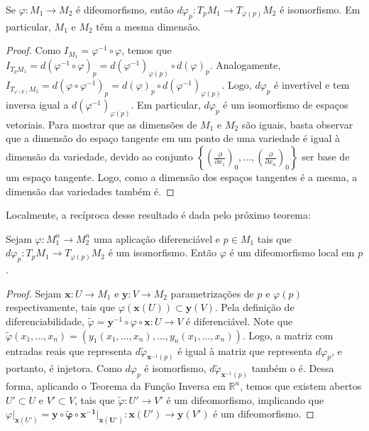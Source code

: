	\begin{proposition}
		\label{prop:difeomorfismo-dimensao}
		Se $\varphi:M_{1}\to M_{2}$ é difeomorfismo, então $d\varphi_{p}:T_{p}M_{1}\to T_{\varphi(p)}M_{2}$ é isomorfismo. Em particular, $M_{1}$ e $M_{2}$ têm a mesma dimensão.
		\begin{proof}

			Como $I_{M_{1}} =\varphi ^{-1} \circ \varphi$, temos que $I_{T_{p}M_{1}}=d(\varphi ^{-1} \circ \varphi)_{p}= d(\varphi ^{-1})_{\varphi(p)} \circ d(\varphi)_{p}$.
			Analogamente, $I_{T_{\varphi(p)}M_{2}}=d(\varphi \circ \varphi ^{-1})_{p}= d(\varphi)_{p} \circ d(\varphi ^{-1})_{\varphi(p)}$.
			Logo, $d\varphi_{p}$ é invertível e tem inversa igual a $d(\varphi ^{-1})_{\varphi(p)}$. Em particular, $d\varphi_{p}$ é um isomorfismo de espaços vetoriais.
			Para mostrar que as dimensões de $M_{1}$ e $M_{2}$ são iguais, basta observar que a dimensão do espaço tangente em um ponto de uma variedade é igual à dimensão da variedade, devido ao conjunto $\left\{  \left( \frac{\partial}{\partial x_{1}} \right)_{0}, \dots, \left( \frac{\partial}{\partial x_{n}} \right)_{0}  \right\}$ ser base de um espaço tangente. Logo, como a dimensão dos espaços tangentes é a mesma, a dimensão das variedades também é.
		\end{proof}
	\end{proposition}
	Localmente, a recíproca desse resultado é dada pelo próximo teorema:
	\begin{theorem}
		\label{teo:funcao-inversa}
		Sejam $\varphi:M_{1}^{n}\to M_{2}^{n}$ uma aplicação diferenciável e $p \in M_{1}$ tais que $d\varphi_{p}:T_{p}M_{1}\to T_{\varphi(p)}M_{2}$ é um isomorfismo. Então $\varphi$ é um difeomorfismo local em $p$.
		\begin{proof}

			Sejam $\mathbf{x}:U\to M_{1}$ e $\mathbf{y}:V\to M_{2}$ parametrizações de $p$ e $\varphi(p)$ respectivamente, tais que $\varphi(\mathbf{x}(U)) \subset \mathbf{y}(V)$.
			Pela definição de diferenciabilidade, $\tilde{\varphi} =\mathbf{y}^{-1} \circ \varphi \circ \mathbf{ x}:U \to V$ é diferenciável. Note que $\tilde{\varphi}(x_{1}, \dots, x_{n})=(y_{1}(x_{1}, \dots, x_{n}), \dots, y_{n}(x_{1}, \dots, x_{n}))$. Logo, a matriz com entradas reais que representa $d\tilde{\varphi}_{\mathbf{x}^{-1}(p)}$ é igual à matriz que representa $d\varphi_{p}$, e portanto, é injetora. Como $d\varphi_{p}$ é isomorfismo, $d \tilde{\varphi}_{\mathbf{x}^{-1}(p)}$ também o é. Dessa forma, aplicando o Teorema da Função Inversa em $\mathbb{R}^{n}$, temos que existem abertos $U' \subset U$ e $V' \subset V$, tais que $\tilde{\varphi}:U' \to V'$ é um difeomorfismo, implicando que $\varphi|_{\mathbf{x}(U')} = \mathbf{y \circ \tilde{\varphi} \circ x ^{-1}|_{\mathbf{x}(U')}}:\mathbf{x}(U')\to \mathbf{y}(V')$ é um difeomorfismo.
		\end{proof}
	\end{theorem}
